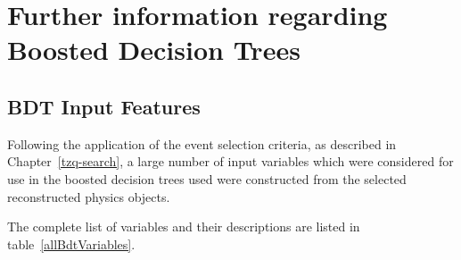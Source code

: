 \chapter{Further information regarding Boosted Decision Trees}\label{app:bdt}

\section{BDT Input Features}\label{appsec:bdtFeatures}
Following the application of the event selection criteria, as described in Chapter~\ref{tzq-search}, a large number of input variables which were considered for use in the boosted decision trees used were constructed from the selected reconstructed physics objects.

The complete list of variables and their descriptions are listed in table~\ref{allBdtVariables}.

